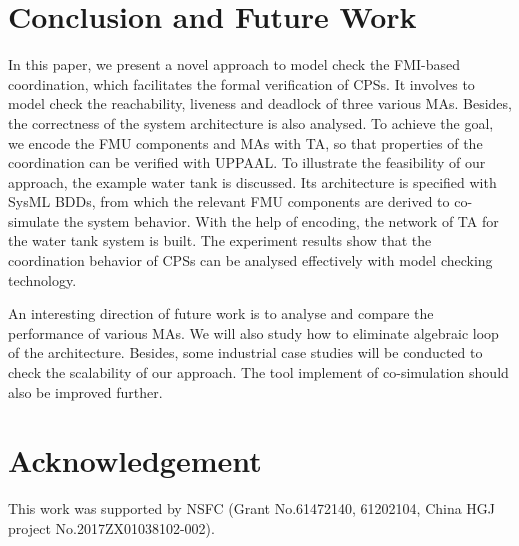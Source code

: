 \section{Conclusion and Future Work}
\label{sec:conclusion&ack}
In this paper, we present a novel approach to model check the FMI-based coordination, which facilitates the formal verification of CPSs. It involves to model check the reachability, liveness and deadlock of three various MAs. Besides, the correctness of the system architecture is also analysed. To achieve the goal, we encode the FMU components and MAs with TA, so that properties of the coordination can be verified with UPPAAL. To illustrate the feasibility of our approach, the example water tank is discussed. Its architecture is specified with SysML BDDs, from which the relevant FMU components are derived to co-simulate the system behavior. With the help of encoding, the network of TA for the water tank system is built. The experiment results show that the coordination behavior of CPSs can be analysed effectively with model checking technology.

An interesting direction of future work is to analyse and compare the performance of various MAs. We will also study how to eliminate algebraic loop of the architecture. Besides, some industrial case studies will be conducted to check the scalability of our approach. The tool implement of co-simulation should also be improved further.
\section*{Acknowledgement}
This work was supported by NSFC (Grant No.61472140, 61202104, China HGJ project No.2017ZX01038102-002). 



